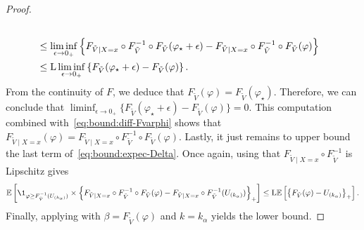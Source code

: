 \begin{proof}
\begin{align}
    \\
    \nonumber
    &\le \liminf_{\epsilon\to 0_+} \left\{{
      F_{\tilde{V}\mid X=x}\circ F_{\tilde{V}}^{-1} \circ F_{\tilde{V}}(\varphi_\star + \epsilon)
      - F_{\tilde{V}\mid X=x}\circ F_{\tilde{V}}^{-1} \circ F_{\tilde{V}}(\varphi)
    }\right\}
    \\
    \label{eq:bound:diff-Fvarphi}
    &\le \mathrm{L} \liminf_{\epsilon\to 0_+} \left\{{F_{\tilde{V}}(\varphi_\star + \epsilon) - F_{\tilde{V}}(\varphi)}\right\}.
  \end{align}
  From the continuity of $F$, we deduce that $F_{\tilde{V}}(\varphi)=F_{\tilde{V}}(\varphi_\star)$. Therefore, we can conclude that $\liminf_{\epsilon\to 0_+} \{F_{\tilde{V}}(\varphi_\star + \epsilon) - F_{\tilde{V}}(\varphi)\} = 0$.
  This computation combined with~\eqref{eq:bound:diff-Fvarphi} shows that $F_{\tilde{V}\mid X=x}(\varphi) = F_{\tilde{V}\mid X=x}\circ F_{\tilde{V}}^{-1} \circ F_{\tilde{V}}(\varphi)$.
  Lastly, it just remains to upper bound the last term of~\eqref{eq:bound:expec-Delta}. Once again, using that $F_{\tilde{V}\mid X=x}\circ F_{\tilde{V}}^{-1}$ is Lipschitz gives
  \begin{equation*}
    \E\br{ \1_{\varphi \ge F_{\tilde{V}}^{-1}(U_{(k_\alpha)})} \times \ac{ F_{\tilde{V}\mid X=x}\circ F_{\tilde{V}}^{-1} \circ F_{\tilde{V}}(\varphi) - F_{\tilde{V}\mid X=x}\circ F_{\tilde{V}}^{-1}(U_{(k_{\alpha})}) }_{+} }
    \le \mathrm{L} \E\br{ \ac{ F_{\tilde{V}}(\varphi) - U_{(k_{\alpha})} }_{+} }.
  \end{equation*}
  Finally, applying  with $\beta=F_{\tilde{V}}(\varphi)$ and $k=k_{\alpha}$ yields the lower bound.


\end{proof}
